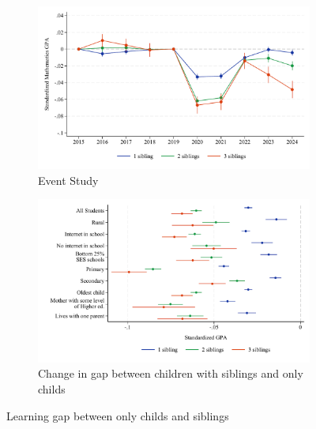 \begin{figure}[htbp]
    \centering
    
    \begin{subfigure}{\textwidth}
        \centering
        \includegraphics[width=\textwidth]{./FIGURES/Event Study/covid_event_bysibs_all_all_std_gpa_m_adj_Tsiblings_Soldest_4.pdf}
        \caption{Event Study}
        \label{fig:main_result_event}
    \end{subfigure}
    
    \vspace{1em} %
    
    \begin{subfigure}{\textwidth}
        \centering
        \includegraphics[width=\textwidth]{./FIGURES/TWFE/covid_twfe_summ_bysibs_all_20-21_gpa_m_adj_Tsiblings_Soldest_4.pdf}
        \caption{Change in gap between children with siblings and only childs}
        \label{fig:main_result_twfe}
    \end{subfigure}
    
    \caption{Learning gap between only childs and siblings}
    \label{fig:main_result}
\end{figure}


\clearpage


%







\clearpage







